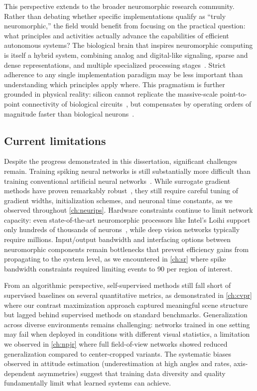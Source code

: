 This perspective extends to the broader neuromorphic research community. Rather than debating whether specific implementations qualify as ``truly neuromorphic,'' the field would benefit from focusing on the practical question: what principles and activities actually advance the capabilities of efficient autonomous systems? The biological brain that inspires neuromorphic computing is itself a hybrid system, combining analog and digital-like signaling, sparse and dense representations, and multiple specialized processing stages~\cite{sterling2015principles}. Strict adherence to any single implementation paradigm may be less important than understanding which principles apply where. This pragmatism is further grounded in physical reality: silicon cannot replicate the massive-scale point-to-point connectivity of biological circuits~\cite{kudithipudi2025neuromorphic}, but compensates by operating orders of magnitude faster than biological neurons~\cite{pehle2022brainscales2}.

\subsection*{Current limitations}

Despite the progress demonstrated in this dissertation, significant challenges remain. Training spiking neural networks is still substantially more difficult than training conventional artificial neural networks~\cite{neftci2019surrogate,tavanaei2019deep}. While surrogate gradient methods have proven remarkably robust~\cite{zenke2021remarkable}, they still require careful tuning of gradient widths, initialization schemes, and neuronal time constants, as we observed throughout \cref{ch:neurips}. Hardware constraints continue to limit network capacity: even state-of-the-art neuromorphic processors like Intel's Loihi support only hundreds of thousands of neurons~\cite{davies2018loihi}, while deep vision networks typically require millions. Input/output bandwidth and interfacing options between neuromorphic components remain bottlenecks that prevent efficiency gains from propagating to the system level, as we encountered in \cref{ch:sr} where spike bandwidth constraints required limiting events to 90 per region of interest.

From an algorithmic perspective, self-supervised methods still fall short of supervised baselines on several quantitative metrics, as demonstrated in \cref{ch:cvpr} where our contrast maximization approach captured meaningful scene structure but lagged behind supervised methods on standard benchmarks. Generalization across diverse environments remains challenging: networks trained in one setting may fail when deployed in conditions with different visual statistics, a limitation we observed in \cref{ch:npjr} where full field-of-view networks showed reduced generalization compared to center-cropped variants. The systematic biases observed in attitude estimation (underestimation at high angles and rates, axis-dependent asymmetries) suggest that training data diversity and quality fundamentally limit what learned systems can achieve.

